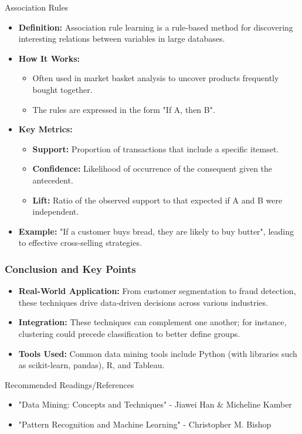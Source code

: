 \documentclass[aspectratio=169]{beamer}
\begin{document}
\begin{frame}[fragile]
    \begin{block}{Association Rules}
        \begin{itemize}
            \item \textbf{Definition:} Association rule learning is a rule-based method for discovering interesting relations between variables in large databases.
            \item \textbf{How It Works:}
            \begin{itemize}
                \item Often used in market basket analysis to uncover products frequently bought together.
                \item The rules are expressed in the form "If A, then B".
            \end{itemize}
            \item \textbf{Key Metrics:}
            \begin{itemize}
                \item \textbf{Support:} Proportion of transactions that include a specific itemset.
                \item \textbf{Confidence:} Likelihood of occurrence of the consequent given the antecedent.
                \item \textbf{Lift:} Ratio of the observed support to that expected if A and B were independent.
            \end{itemize}
            \item \textbf{Example:} "If a customer buys bread, they are likely to buy butter", leading to effective cross-selling strategies.
        \end{itemize}
    \end{block}
\end{frame}

\begin{frame}[fragile]
    \frametitle{Conclusion and Key Points}
    \begin{itemize}
        \item \textbf{Real-World Application:} From customer segmentation to fraud detection, these techniques drive data-driven decisions across various industries.
        \item \textbf{Integration:} These techniques can complement one another; for instance, clustering could precede classification to better define groups.
        \item \textbf{Tools Used:} Common data mining tools include Python (with libraries such as scikit-learn, pandas), R, and Tableau.
    \end{itemize}
    
    \begin{block}{Recommended Readings/References}
        \begin{itemize}
            \item "Data Mining: Concepts and Techniques" - Jiawei Han \& Micheline Kamber
            \item "Pattern Recognition and Machine Learning" - Christopher M. Bishop
        \end{itemize}
    \end{block}
\end{frame}
\end{document}

